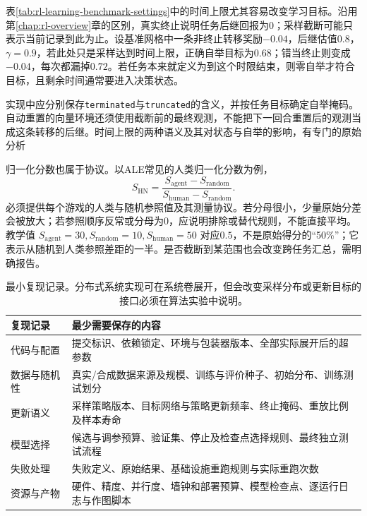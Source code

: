 表\ref{tab:rl-learning-benchmark-settings}中的时间上限尤其容易改变学习目标。沿用第\ref{chap:rl-overview}章的区别，真实终止说明任务后继回报为0；采样截断可能只表示当前记录到此为止。设基准网格中一条非终止转移奖励$-0.04$，后继估值$0.8$，$\gamma=0.9$，若此处只是采样达到时间上限，正确自举目标为$0.68$；错当终止则变成$-0.04$，每次都漏掉$0.72$。若任务本来就定义为到这个时限结束，则零自举才符合目标，且剩余时间通常要进入决策状态。

实现中应分别保存\texttt{terminated}与\texttt{truncated}的含义，并按任务目标确定自举掩码。自动重置的向量环境还须使用截断前的最终观测，不能把下一回合重置后的观测当成这条转移的后继。时间上限的两种语义及其对状态与自举的影响，有专门的原始分析

归一化分数也属于协议。以ALE常见的人类归一化分数为例，
\[
  S_{\mathrm{HN}}
   =\frac{S_{\mathrm{agent}}-S_{\mathrm{random}}}
          {S_{\mathrm{human}}-S_{\mathrm{random}}}.
\]
必须提供每个游戏的人类与随机参照值及其测量协议。若分母很小，少量原始分差会被放大；若参照顺序反常或分母为0，应说明排除或替代规则，不能直接平均。教学值
$S_{\mathrm{agent}}=30,S_{\mathrm{random}}=10,S_{\mathrm{human}}=50$
对应$0.5$，不是原始得分的“50\%”；它表示从随机到人类参照差距的一半。是否截断到某范围也会改变跨任务汇总，需明确报告。

\begin{table}[t]
  \centering
  \small
  \begin{tabularx}{\linewidth}{>{\raggedright\arraybackslash}p{28mm} >{\raggedright\arraybackslash}X}
    \toprule
    复现记录 & 最少需要保存的内容 \\
    \midrule
    代码与配置 & 提交标识、依赖锁定、环境与包装器版本、全部实际展开后的超参数 \\
    数据与随机性 & 真实/合成数据来源及规模、训练与评价种子、初始分布、训练测试划分 \\
    更新语义 & 采样策略版本、目标网络与策略更新频率、终止掩码、重放比例及样本寿命 \\
    模型选择 & 候选与调参预算、验证集、停止及检查点选择规则、最终独立测试流程 \\
    失败处理 & 失败定义、原始结果、基础设施重跑规则与实际重跑次数 \\
    资源与产物 & 硬件、精度、并行度、墙钟和部署预算、模型检查点、逐运行日志与作图脚本 \\
    \bottomrule
  \end{tabularx}
  \caption{最小复现记录。分布式系统实现可在系统卷展开，但会改变采样分布或更新目标的接口必须在算法实验中说明。}
  \label{tab:rl-learning-reproducibility}
\end{table}

